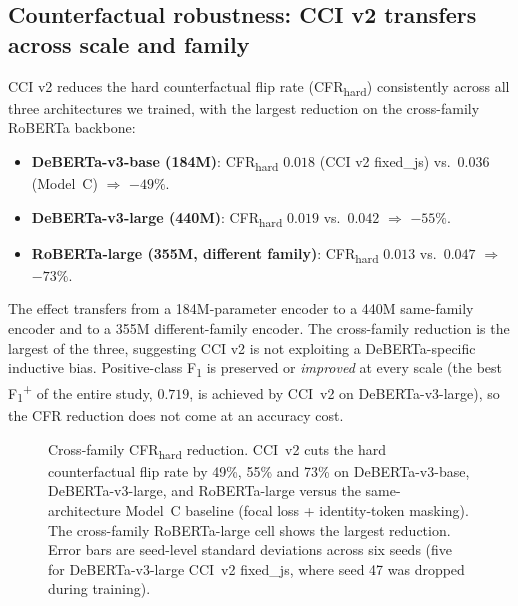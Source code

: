\documentclass[10pt,a4paper]{article}
\begin{document}
\subsection{Counterfactual robustness: CCI v2 transfers across scale and family}
\label{sec:cfr_results}

CCI v2 reduces the hard counterfactual flip rate (CFR\textsubscript{hard}) consistently across all three architectures we trained, with the largest reduction on the cross-family RoBERTa backbone:

\begin{itemize}[leftmargin=*,itemsep=2pt]
    \item \textbf{DeBERTa-v3-base (184M)}: CFR\textsubscript{hard} $0.018$ (CCI v2 fixed\_js) vs.\ $0.036$ (Model~C) $\Rightarrow$ \textbf{$-49\%$}.
    \item \textbf{DeBERTa-v3-large (440M)}: CFR\textsubscript{hard} $0.019$ vs.\ $0.042$ $\Rightarrow$ \textbf{$-55\%$}.
    \item \textbf{RoBERTa-large (355M, different family)}: CFR\textsubscript{hard} $0.013$ vs.\ $0.047$ $\Rightarrow$ \textbf{$-73\%$}.
\end{itemize}
The effect transfers from a 184M-parameter encoder to a 440M same-family encoder and to a 355M different-family encoder. The cross-family reduction is the largest of the three, suggesting CCI v2 is not exploiting a DeBERTa-specific inductive bias. Positive-class F\textsubscript{1} is preserved or \emph{improved} at every scale (the best F\textsubscript{1}\textsuperscript{+} of the entire study, $0.719$, is achieved by CCI~v2 on DeBERTa-v3-large), so the CFR reduction does not come at an accuracy cost.

\begin{figure}[h]
\centering
\caption{Cross-family CFR\textsubscript{hard} reduction. CCI~v2 cuts the hard counterfactual flip rate by 49\%, 55\% and 73\% on DeBERTa-v3-base, DeBERTa-v3-large, and RoBERTa-large versus the same-architecture Model~C baseline (focal loss + identity-token masking). The cross-family RoBERTa-large cell shows the largest reduction. Error bars are seed-level standard deviations across six seeds (five for DeBERTa-v3-large CCI~v2 fixed\_js, where seed 47 was dropped during training).}
\label{fig:panel_cfr}
\end{figure}
\end{document}
